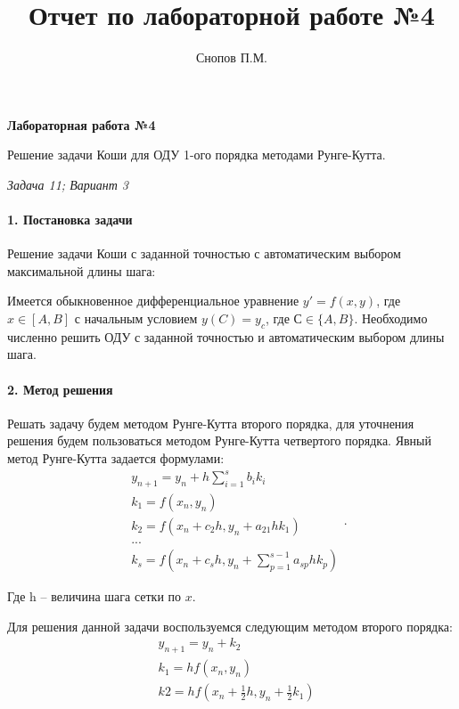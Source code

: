 \documentclass[11pt,a4paper]{report}
\begin{document}
	
\lstset{ 
	language=Python, 
	tabsize=2, 
	showspaces=false, 
	showstringspaces=false, 
	float=[htb], 
	captionpos=b, 
	basicstyle=\footnotesize,
	numberblanklines=false, 
} 



\title{Отчет по лабораторной работе №4}

\author{Снопов П.М.}
\thispagestyle{titlepagestyle}
\maketitle
\begin{center}
	\textbf{Лабораторная работа №4}
	
	Решение задачи Коши для ОДУ 1-ого порядка методами Рунге-Кутта. 
	
	\textit{Задача 11; Вариант 3}
\end{center}

\paragraph{1. Постановка задачи}
Решение задачи Коши с заданной точностью с автоматическим выбором максимальной длины шага:

Имеется обыкновенное дифференциальное уравнение $ y' = f(x,y) $, где $ x \in [A, B] $ с начальным условием $ y(C) = y_c $, где $ С \in \{A,B\} $. Необходимо численно решить ОДУ с заданной точностью и автоматическим выбором длины шага.
\paragraph{2. Метод решения}
Решать задачу будем методом Рунге-Кутта второго порядка, для уточнения решения будем пользоваться методом Рунге-Кутта четвертого порядка. Явный метод Рунге-Кутта задается формулами:
\[
\begin{aligned}
&y_{n+1} = y_n + h\sum_{i=1}^s b_ik_i \\
&k_1 = f(x_n, y_n)\\
&k_2 = f(x_n + c_2h, y_n + a_{21}hk_1)\\
&...\\
&k_s = f(x_n + c_sh, y_n+\sum_{p=1}^{s-1} a_{sp}hk_p)
\end{aligned}.
\]

Где h -- величина шага сетки по $ x $.

Для решения данной задачи воспользуемся следующим методом второго порядка:
\[
\begin{aligned}
&y_{n+1} = y_n + k_2\\
&k_1 = hf(x_n,y_n)\\
&k2 = hf(x_n + \frac{1}{2}h, y_n + \frac{1}{2}k_1)
\end{aligned}
\]
\end{document}
